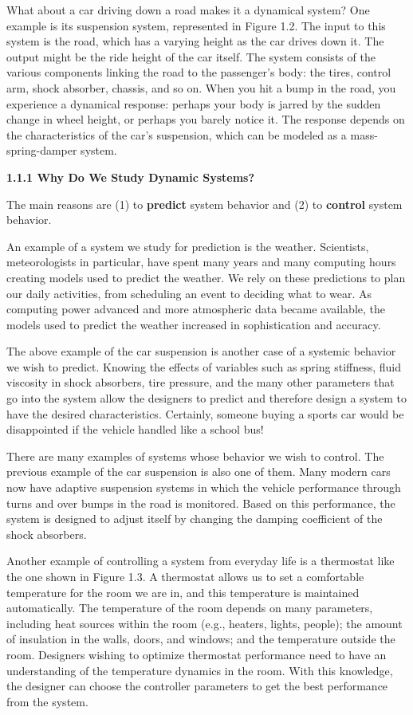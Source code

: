 \documentclass[12pt]{article}
\begin{document}
What about a car driving down a road makes it a dynamical system?
One example is its suspension system, represented in Figure 1.2. The input
to this system is the road, which has a varying height as the car drives down
it. The output might be the ride height of the car itself. The system consists
of the various components linking the road to the passenger’s body: the
tires, control arm, shock absorber, chassis, and so on. When you hit a bump
in the road, you experience a dynamical response: perhaps your body is
jarred by the sudden change in wheel height, or perhaps you barely notice
it. The response depends on the characteristics of the car’s suspension,
which can be modeled as a mass-spring-damper system.

\hfill

\textbf{1.1.1 Why Do We Study Dynamic Systems?}

\hfill

The main reasons are (1) to \textbf{predict} system behavior and (2) to \textbf{control}
system behavior.

An example of a system we study for prediction is the weather. Scientists,
meteorologists in particular, have spent many years and many
computing hours creating models used to predict the weather. We rely on
these predictions to plan our daily activities, from scheduling an event to
deciding what to wear. As computing power advanced and more atmospheric
data became available, the models used to predict the weather
increased in sophistication and accuracy.

The above example of the car suspension is another case of a systemic
behavior we wish to predict. Knowing the effects of variables such as spring
stiffness, fluid viscosity in shock absorbers, tire pressure, and the many other
parameters that go into the system allow the designers to predict and
therefore design a system to have the desired characteristics. Certainly,
someone buying a sports car would be disappointed if the vehicle handled
like a school bus!

There are many examples of systems whose behavior we wish to
control. The previous example of the car suspension is also one of them.
Many modern cars now have adaptive suspension systems in which the
vehicle performance through turns and over bumps in the road is monitored.
Based on this performance, the system is designed to adjust itself by
changing the damping coefficient of the shock absorbers.

Another example of controlling a system from everyday life is a thermostat
like the one shown in Figure 1.3. A thermostat allows us to set a
comfortable temperature for the room we are in, and this temperature is
maintained automatically. The temperature of the room depends on many
parameters, including heat sources within the room (e.g., heaters, lights,
people); the amount of insulation in the walls, doors, and windows; and the
temperature outside the room. Designers wishing to optimize thermostat
performance need to have an understanding of the temperature dynamics in
the room. With this knowledge, the designer can choose the controller
parameters to get the best performance from the system.
\end{document}
